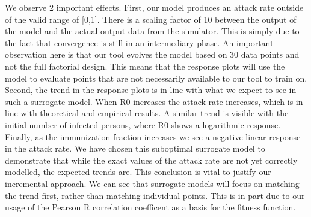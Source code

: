 We observe 2 important effects. First, our model produces an attack rate outside of the valid range of [0,1]. There is a scaling factor of 10 between the output of the model and the actual output data from the simulator. This is simply due to the fact that convergence is still in an intermediary phase. An important observation here is that our tool evolves the model based on 30 data points and not the full factorial design. This means that the response plots will use the model to evaluate points that are not necessarily available to our tool to train on. Second, the trend in the response plots is in line with what we expect to see in such a surrogate model. When R0 increases the attack rate increases, which is in line with theoretical and empirical results. A similar trend is visible with the initial number of infected persons, where R0 shows a logarithmic response. Finally, as the immunization fraction increases we see a negative linear response in the attack rate. We have chosen this suboptimal surrogate model to demonstrate that while the exact values of the attack rate are not yet correctly modelled, the expected trends are. This conclusion is vital to justify our incremental approach. We can see that surrogate models will focus on matching the trend first, rather than matching individual points. This is in part due to our usage of the Pearson R correlation coefficent as a basis for the fitness function. 



